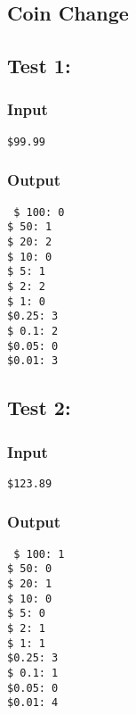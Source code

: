 \documentclass[9pt]{extarticle}
\begin{document}
\begin{multicols}{2}

\section{Coin Change}
\subsection*{Test 1:}
\subsubsection*{Input}
\texttt{\$99.99}
\subsubsection*{Output}
\texttt{%
\$ 100: 0\\
\$  50: 1\\
\$  20: 2\\
\$  10: 0\\
\$   5: 1\\
\$   2: 2\\
\$   1: 0\\
\$0.25: 3\\
\$ 0.1: 2\\
\$0.05: 0\\
\$0.01: 3
}

\subsection*{Test 2:}

\subsubsection*{Input}
\texttt{\$123.89}
\subsubsection*{Output}
\texttt{%
\$ 100: 1\\
\$  50: 0\\
\$  20: 1\\
\$  10: 0\\
\$   5: 0\\
\$   2: 1\\
\$   1: 1\\
\$0.25: 3\\
\$ 0.1: 1\\
\$0.05: 0\\
\$0.01: 4}


\end{multicols}
\end{document}
